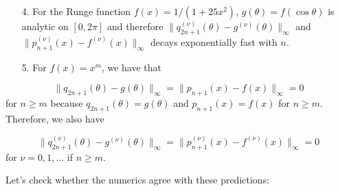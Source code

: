 \documentclass[12pt,a4paper]{article}
\begin{document}
\begin{itemize}
\item[4. ] For the Runge function $f(x) = 1/(1 + 25x^2)$,  $g(\theta) = f(\cos\theta)$ is analytic on $[0, 2\pi]$ and therefore $\| q_{2n+1}^{(\nu)}(\theta) - g^{(\nu)}(\theta) \|_{\infty}$ and $\| p_{n+1}^{(\nu)}(x) - f^{(\nu)}(x) \|_{\infty}$ decays exponentially fast with $n$. 


\item[5. ] For $f(x) = x^{m}$, we have that

\end{itemize}
\[
\| q_{2n+1}(\theta) - g(\theta) \|_{\infty} = \| p_{n+1}(x) - f(x) \|_{\infty} = 0
\]
for $n \geq m$ because $q_{2n+1}(\theta) = g(\theta)$ and $p_{n+1}(x) = f(x)$ for $n \geq m$.  Therefore, we also have  

\[
\| q_{2n+1}^{(\nu)}(\theta) - g^{(\nu)}(\theta) \|_{\infty} = \| p_{n+1}^{(\nu)}(x) - f^{(\nu)}(x) \|_{\infty} = 0
\]
for $\nu = 0, 1, \ldots$ if $n \geq m$.

Let's check whether the numerics agree with these predictions:
\end{document}
